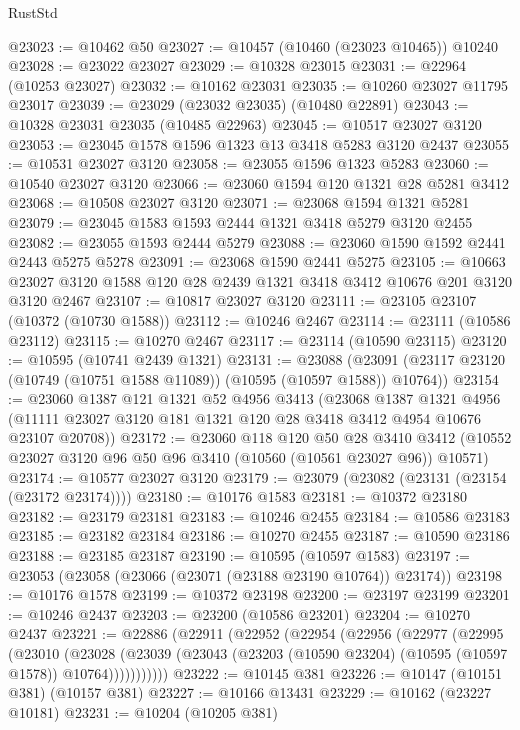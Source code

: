 \begin{lexlean}{RustStd}
\begin{coremodule}
@23023 := @10462 @50
@23027 := @10457 (@10460 (@23023 @10465)) @10240
@23028 := @23022 @23027
@23029 := @10328 @23015
@23031 := @22964 (@10253 @23027)
@23032 := @10162 @23031
@23035 := @10260 @23027 @11795 @23017
@23039 := @23029 (@23032 @23035) (@10480 @22891)
@23043 := @10328 @23031 @23035 (@10485 @22963)
@23045 := @10517 @23027 @3120
@23053 := @23045 @1578 @1596 @1323 @13 @3418 @5283 @3120 @2437
@23055 := @10531 @23027 @3120
@23058 := @23055 @1596 @1323 @5283
@23060 := @10540 @23027 @3120
@23066 := @23060 @1594 @120 @1321 @28 @5281 @3412
@23068 := @10508 @23027 @3120
@23071 := @23068 @1594 @1321 @5281
@23079 := @23045 @1583 @1593 @2444 @1321 @3418 @5279 @3120 @2455
@23082 := @23055 @1593 @2444 @5279
@23088 := @23060 @1590 @1592 @2441 @2443 @5275 @5278
@23091 := @23068 @1590 @2441 @5275
@23105 := @10663 @23027 @3120 @1588 @120 @28 @2439 @1321 @3418 @3412 @10676 @201 @3120 @3120 @2467
@23107 := @10817 @23027 @3120
@23111 := @23105 @23107 (@10372 (@10730 @1588))
@23112 := @10246 @2467
@23114 := @23111 (@10586 @23112)
@23115 := @10270 @2467
@23117 := @23114 (@10590 @23115)
@23120 := @10595 (@10741 @2439 @1321)
@23131 := @23088
    (@23091 (@23117 @23120 (@10749 (@10751 @1588 @11089)) (@10595 (@10597 @1588)) @10764))
@23154 := @23060
    @1387
    @121
    @1321
    @52
    @4956
    @3413
    (@23068
      @1387
      @1321
      @4956
      (@11111 @23027 @3120 @181 @1321 @120 @28 @3418 @3412 @4954 @10676 @23107 @20708))
@23172 := @23060
    @118
    @120
    @50
    @28
    @3410
    @3412
    (@10552 @23027 @3120 @96 @50 @96 @3410 (@10560 (@10561 @23027 @96)) @10571)
@23174 := @10577 @23027 @3120
@23179 := @23079 (@23082 (@23131 (@23154 (@23172 @23174))))
@23180 := @10176 @1583
@23181 := @10372 @23180
@23182 := @23179 @23181
@23183 := @10246 @2455
@23184 := @10586 @23183
@23185 := @23182 @23184
@23186 := @10270 @2455
@23187 := @10590 @23186
@23188 := @23185 @23187
@23190 := @10595 (@10597 @1583)
@23197 := @23053 (@23058 (@23066 (@23071 (@23188 @23190 @10764)) @23174))
@23198 := @10176 @1578
@23199 := @10372 @23198
@23200 := @23197 @23199
@23201 := @10246 @2437
@23203 := @23200 (@10586 @23201)
@23204 := @10270 @2437
@23221 := @22886
    (@22911
      (@22952
        (@22954
          (@22956
            (@22977
              (@22995
                (@23010
                  (@23028
                    (@23039
                      (@23043 (@23203 (@10590 @23204) (@10595 (@10597 @1578)) @10764)))))))))))
@23222 := @10145 @381
@23226 := @10147 (@10151 @381) (@10157 @381)
@23227 := @10166 @13431
@23229 := @10162 (@23227 @10181)
@23231 := @10204 (@10205 @381)

\end{coremodule}
\end{lexlean}
